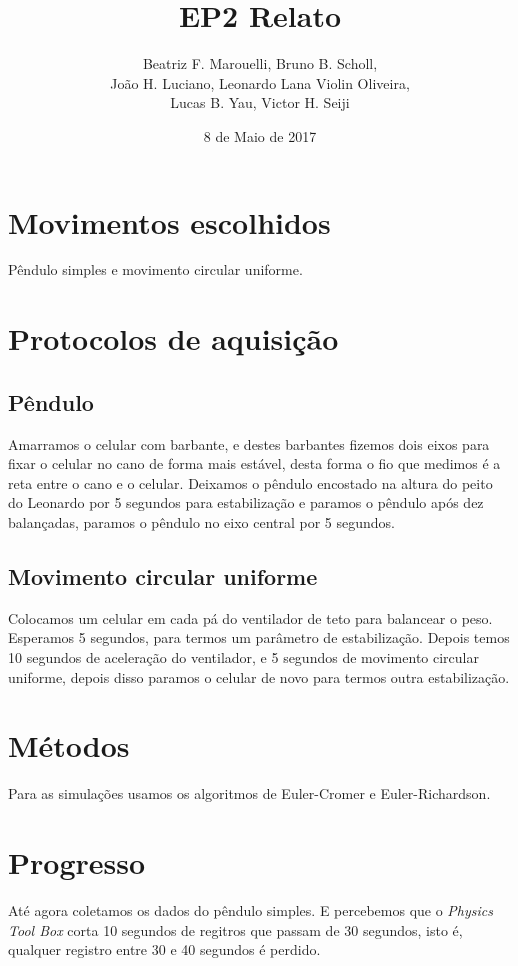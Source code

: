 \documentclass[a4paper, 12pt]{article}
\title{EP2 Relato}
\author{Beatriz F. Marouelli, Bruno B. Scholl, \\João H. Luciano, Leonardo Lana Violin Oliveira, \\ Lucas B. Yau, Victor H. Seiji}
\date{8 de Maio de 2017}
\begin{document}
\maketitle

\section*{Movimentos escolhidos}
Pêndulo simples e movimento circular uniforme.

\section*{Protocolos de aquisição}

\subsection*{Pêndulo}
Amarramos o celular com barbante, e destes barbantes fizemos dois eixos para fixar o celular no cano de forma mais estável, desta forma o fio que medimos é a reta entre o cano e o celular. Deixamos o pêndulo encostado na altura do peito do Leonardo por 5 segundos para estabilização e paramos o pêndulo após dez balançadas, paramos o pêndulo no eixo central por 5 segundos.

\subsection*{Movimento circular uniforme}
Colocamos um celular em cada pá do ventilador de teto para balancear o peso. Esperamos 5 segundos, para termos um parâmetro de estabilização. Depois temos 10 segundos de aceleração do ventilador, e 5 segundos de movimento circular uniforme, depois disso paramos o celular de novo para termos outra estabilização.

\section*{Métodos}
Para as simulações usamos os algoritmos de Euler-Cromer e Euler-Richardson.

\section*{Progresso}
Até agora coletamos os dados do pêndulo simples. E percebemos que o \textit{Physics Tool Box} corta 10 segundos de regitros que passam de 30 segundos, isto é, qualquer registro entre 30 e 40 segundos é perdido.
\end{document}
